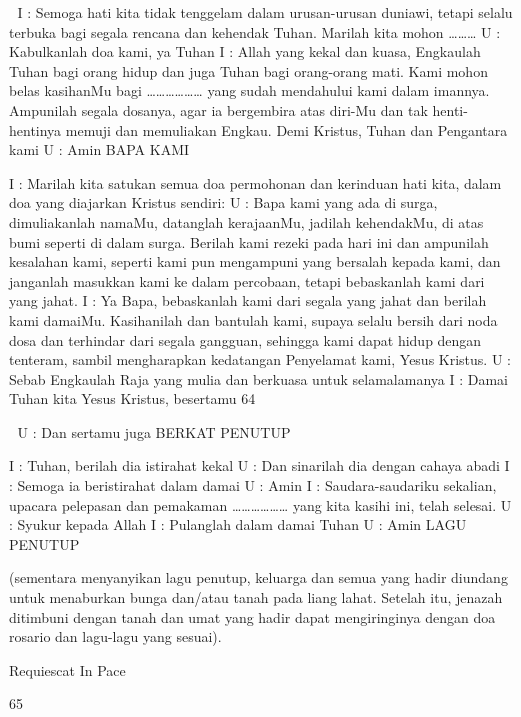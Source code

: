 
I : Semoga hati kita tidak tenggelam dalam urusan-urusan duniawi, 
tetapi selalu terbuka bagi segala rencana dan kehendak Tuhan. 
Marilah kita mohon ……… 
U : Kabulkanlah doa kami, ya Tuhan 
I : Allah yang kekal dan kuasa, Engkaulah Tuhan bagi orang hidup 
dan juga Tuhan bagi orang-orang mati. Kami mohon belas 
kasihanMu bagi ……………… yang sudah mendahului kami dalam 
imannya. Ampunilah segala dosanya, agar ia bergembira atas diri-Mu 
dan tak henti-hentinya memuji dan memuliakan Engkau. Demi 
Kristus, Tuhan dan Pengantara kami 
U : Amin 
BAPA KAMI 

I : Marilah kita satukan semua doa permohonan dan kerinduan hati 
kita, dalam doa yang diajarkan Kristus sendiri: 
U : Bapa kami yang ada di surga, dimuliakanlah namaMu, datanglah 
kerajaanMu, jadilah kehendakMu, di atas bumi seperti di dalam 
surga. Berilah kami rezeki pada hari ini dan ampunilah kesalahan 
kami, seperti kami pun mengampuni yang bersalah kepada kami, dan 
janganlah masukkan kami ke dalam percobaan, tetapi bebaskanlah 
kami dari yang jahat. 
I : Ya Bapa, bebaskanlah kami dari segala yang jahat dan berilah 
kami damaiMu. Kasihanilah dan bantulah kami, supaya selalu bersih 
dari noda dosa dan terhindar dari segala gangguan, sehingga kami 
dapat hidup dengan tenteram, sambil mengharapkan kedatangan 
Penyelamat kami, Yesus Kristus. 
U : Sebab Engkaulah Raja yang mulia dan berkuasa untuk selamalamanya 
I : Damai Tuhan kita Yesus Kristus, besertamu 
64 



U : Dan sertamu juga 
BERKAT PENUTUP 

I : Tuhan, berilah dia istirahat kekal 
U : Dan sinarilah dia dengan cahaya abadi 
I : Semoga ia beristirahat dalam damai 
U : Amin 
I : Saudara-saudariku sekalian, upacara pelepasan dan pemakaman 
……………… yang kita kasihi ini, telah selesai. 
U : Syukur kepada Allah 
I : Pulanglah dalam damai Tuhan 
U : Amin 
LAGU PENUTUP 

(sementara menyanyikan lagu penutup, keluarga dan semua yang 
hadir diundang untuk menaburkan bunga dan/atau tanah pada liang 
lahat. Setelah itu, jenazah ditimbuni dengan tanah dan umat yang 
hadir dapat mengiringinya dengan doa rosario dan lagu-lagu yang 
sesuai). 

Requiescat In Pace 

65 



